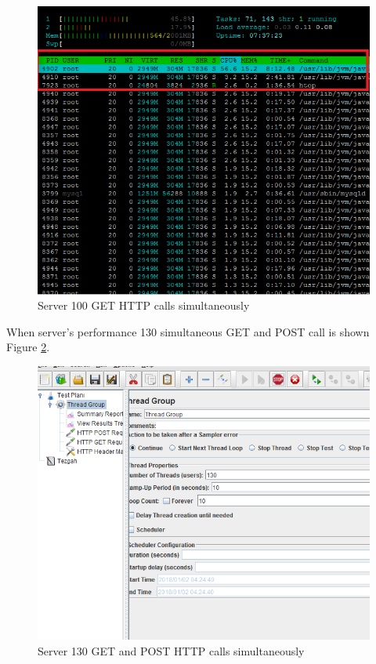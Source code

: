 \begin{figure}[!htbp]
\centering
\includegraphics[width=\textwidth]{projectChapters/images/100users2.png}
\caption{Server 100 GET HTTP calls simultaneously}
\label{fig:100users}
\end{figure}

\newpage

When server's performance 130 simultaneous GET and POST call is shown Figure
\ref{fig:130users}.

\begin{figure}[!htbp]
\centering
\includegraphics[width=\textwidth]{projectChapters/images/130users1.png}
\caption{Server 130 GET and POST HTTP calls simultaneously}
\label{fig:130users}
\end{figure}

